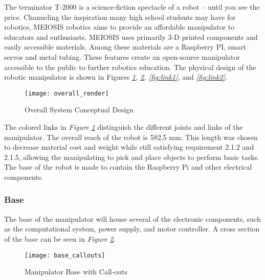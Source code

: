 The terminator T-2000 is a science-fiction spectacle of a robot -- until you see the price. Channeling the inspiration many high school students may have for robotics, MEIOSIS robotics aims to provide an affordable manipulator to educators and enthusiasts. MEIOSIS uses primarily 3-D printed components and easily accessible materials. Among these materials are a Raspberry PI, smart servos and metal tubing. These features create an open-source manipulator accessible to the public to further robotics education.
The physical design of the robotic manipulator is shown in Figures \emph{\ref{fig:overall}, \ref{fig:base}, \ref{fig:link1},} and \emph{\ref{fig:link2}}.

\begin{figure}[htp]
  \centering
  \texttt{[image: overall\_render]}
  \caption{Overall System Conceptual Design }
  \label{fig:overall}
\end{figure}

The colored links in \emph{Figure \ref{fig:overall}} distinguish the different joints and links of the manipulator. The overall reach of the robot is 582.5 mm. This length was chosen to decrease material cost and weight while still satisfying requirement 2.1.2 and 2.1.5, allowing the manipulating to pick and place objects to perform basic tasks. The base of the robot is made to contain the Raspberry Pi and other electrical components.
\newpage
\subsubsection{Base}
The base of the manipulator will house several of the electronic components, such as the computational system, power supply, and motor controller. A cross section of the base can be seen in \emph{Figure \ref{fig:base}}.
\begin{figure}[htp]
  \centering
  \texttt{[image: base\_callouts]}
  \caption{Manipulator Base with Call-outs}
  \label{fig:base}
\end{figure}

